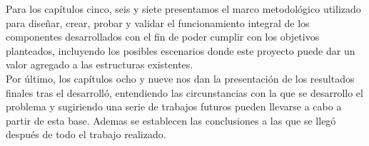 Para los capítulos cinco, seis y siete presentamos el marco metodológico utilizado para diseñar, crear, probar y validar el funcionamiento integral de los componentes desarrollados con el fin de poder cumplir con los objetivos planteados, incluyendo los posibles escenarios donde este proyecto puede dar un valor agregado a las estructuras existentes.\\
 
Por último, los capítulos ocho y nueve nos dan la presentación de los resultados finales tras el desarrolló, entendiendo las circunstancias con la que se desarrollo el problema y sugiriendo una serie de trabajos futuros pueden llevarse a cabo a partir de esta base. Ademas se establecen las conclusiones a las que se llegó después de todo el trabajo realizado.\\
